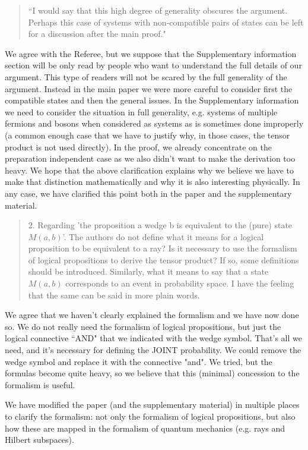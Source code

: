 \documentclass[11pt]{article}
\begin{document}
\begin{quote}
``I would say that this high degree of generality obscures
the argument. Perhaps this case of systems with non-compatible pairs
of states can be left for a discussion after the main proof."
\end{quote}
We agree with the Referee, but we suppose that the Supplementary
information section will be only read by people who want to understand
the full details of our argument. This type of readers will not be
scared by the full generality of the argument. Instead in the main
paper we were more careful to consider first the compatible states and
then the general issues. In the Supplementary information we need to
consider the situation in full generality, e.g.  systems of multiple
fermions and bosons when considered as systems as is sometimes done
improperly (a common enough case that we have to justify why, in those
cases, the tensor product is not used directly). In the proof, we
already concentrate on the preparation independent case as we also
didn't want to make the derivation too heavy. We hope that the above
clarification explains why we believe we have to make that distinction
mathematically and why it is also interesting physically. In any case,
we have clarified this point both in the paper and the supplementary
material.

\begin{quote}
2. Regarding 'the proposition a wedge b is equivalent to
the (pure) state $M (a, b)$'. The authors do not define what it means
for a logical proposition to be equivalent to a ray? Is it necessary
to use the formalism of logical propositions to derive the tensor
product? If so, some definitions should be introduced.  Similarly,
what it means to say that a state $M (a, b)$ corresponds to an event in
probability space. I have the feeling that the same can be said in
more plain words.
\end{quote}

We agree that we haven't clearly explained the formalism and we have
now done so. We do not really need the formalism of logical
propositions, but just the logical connective ``AND" that we indicated
with the wedge symbol. That's all we need, and it's necessary for
defining the JOINT probability. We could remove the wedge symbol and
replace it with the connective "and". We tried, but the formulas
become quite heavy, so we believe that this (minimal) concession to
the formalism is useful. 
	
We have modified the paper (and the supplementary material) in
multiple places to clarify the formalism: not only the formalism of
logical propositions, but also how these are mapped in the formalism of quantum mechanics
(e.g. rays and Hilbert subspaces).
\end{document}
